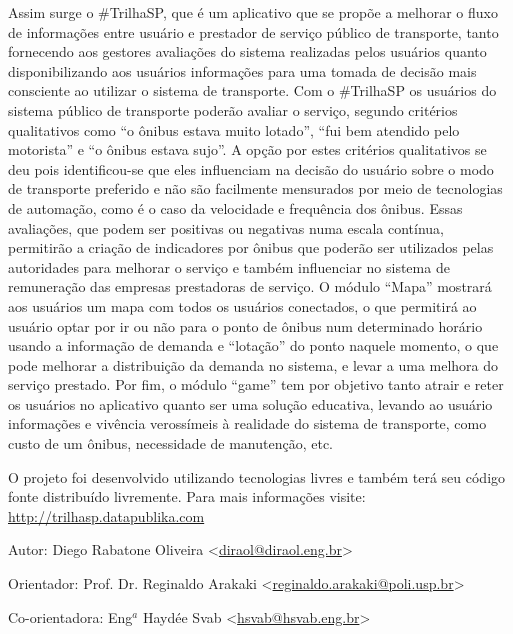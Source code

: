 \documentclass[a4paper,oneside,12pt,english,brazil]{article}
\begin{document}
Assim surge o \#TrilhaSP, que é um aplicativo que se propõe a melhorar o fluxo de informações entre usuário e prestador de serviço público de transporte, tanto fornecendo aos gestores avaliações do sistema realizadas pelos usuários quanto disponibilizando aos usuários informações para uma tomada de decisão mais consciente ao utilizar o sistema de transporte.
Com o \#TrilhaSP os usuários do sistema público de transporte poderão avaliar o serviço, segundo critérios qualitativos como ``o ônibus estava muito lotado'', ``fui bem atendido pelo motorista'' e ``o ônibus estava sujo''. A opção por estes critérios qualitativos se deu pois identificou-se que eles influenciam na decisão do usuário sobre o modo de transporte preferido e não são facilmente mensurados por meio de tecnologias de automação, como é o caso da velocidade e frequência dos ônibus. Essas avaliações, que podem ser positivas ou negativas numa escala contínua, permitirão a criação de indicadores por ônibus que poderão ser utilizados pelas autoridades para melhorar o serviço e também influenciar no sistema de remuneração das empresas prestadoras de serviço. O módulo ``Mapa'' mostrará aos usuários um mapa com todos os usuários conectados, o que permitirá ao usuário optar por ir ou não para o ponto de ônibus num determinado horário usando a informação de demanda e ``lotação'' do ponto naquele momento, o que pode melhorar a distribuição da demanda no sistema, e levar a uma melhora do serviço prestado. Por fim, o módulo ``game'' tem por objetivo tanto atrair e reter os usuários no aplicativo quanto ser uma solução educativa, levando ao usuário informações e vivência verossímeis à realidade do sistema de transporte, como custo de um ônibus, necessidade de manutenção, etc.

O projeto foi desenvolvido utilizando tecnologias livres e também terá seu código fonte distribuído livremente.
Para mais informações visite: \url{http://trilhasp.datapublika.com}

\noindent
\hrulefill

\noindent
Autor: Diego Rabatone Oliveira <\href{mailto:diraol@diraol.eng.br}{diraol@diraol.eng.br}>

\noindent
Orientador: Prof. Dr. Reginaldo Arakaki <\href{mailto:reginaldo.arakaki@poli.usp.br}{reginaldo.arakaki@poli.usp.br}>

\noindent
Co-orientadora: Eng$^{a}$ Haydée Svab <\href{mailto:hsvab@hsvab.eng.br}{hsvab@hsvab.eng.br}>
\end{document}
